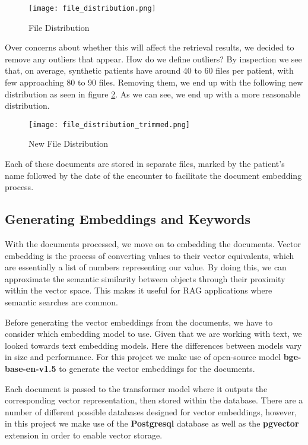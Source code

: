 \begin{figure}[h]
	\centering
	\texttt{[image: file\_distribution.png]}
	\caption{File Distribution}
	\label{fig:FileDistribution}
\end{figure}

Over concerns about whether this will affect the retrieval results, we decided to remove any outliers that appear. How do we define outliers? By inspection we see that, on average, synthetic patients have around 40 to 60 files per patient, with few approaching 80 to 90 files.
Removing them, we end up with the following new distribution as seen in figure \ref{fig:FileDistributionAfter}. As we can see, we end up with a more reasonable distribution.

\begin{figure}[h]
	\centering
	\texttt{[image: file\_distribution\_trimmed.png]}
	\caption{New File Distribution}
	\label{fig:FileDistributionAfter}
\end{figure}

Each of these documents are stored in separate files, marked by the patient's name followed by the date of the encounter to facilitate the document embedding process.

\subsection{Generating Embeddings and Keywords}

With the documents processed, we move on to embedding the documents. Vector embedding is the process of converting values to their vector equivalents, which are essentially a list of numbers representing our value.
By doing this, we can approximate the semantic similarity between objects through their proximity within the vector space. This makes it useful for RAG applications where semantic searches are common.

Before generating the vector embeddings from the documents, we have to consider which embedding model to use. Given that we are working with text, we looked towards text embedding models. Here the differences between models vary in size and performance. For this project we make use of open-source model \textbf{bge-base-en-v1.5} to generate the vector embeddings for the documents.

Each document is passed to the transformer model where it outputs the corresponding vector representation, then stored within the database. There are a number of different possible databases designed for vector embeddings, however, in this project we make use of the \textbf{Postgresql} database as well as the \textbf{pgvector} extension in order to enable vector storage.

